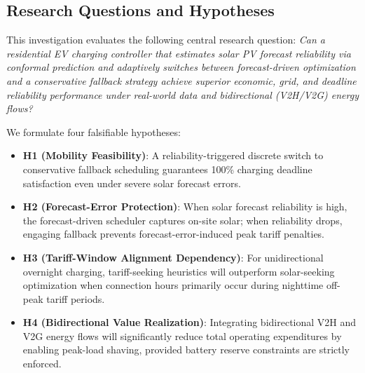 \documentclass[conference]{IEEEtran}
\begin{document}
\subsection{Research Questions and Hypotheses}
This investigation evaluates the following central research question:
\textit{Can a residential EV charging controller that estimates solar PV forecast reliability via conformal prediction and adaptively switches between forecast-driven optimization and a conservative fallback strategy achieve superior economic, grid, and deadline reliability performance under real-world data and bidirectional (V2H/V2G) energy flows?}

We formulate four falsifiable hypotheses:
\begin{itemize}
    \item \textbf{H1 (Mobility Feasibility)}: A reliability-triggered discrete switch to conservative fallback scheduling guarantees 100\% charging deadline satisfaction even under severe solar forecast errors.
    \item \textbf{H2 (Forecast-Error Protection)}: When solar forecast reliability is high, the forecast-driven scheduler captures on-site solar; when reliability drops, engaging fallback prevents forecast-error-induced peak tariff penalties.
    \item \textbf{H3 (Tariff-Window Alignment Dependency)}: For unidirectional overnight charging, tariff-seeking heuristics will outperform solar-seeking optimization when connection hours primarily occur during nighttime off-peak tariff periods.
    \item \textbf{H4 (Bidirectional Value Realization)}: Integrating bidirectional V2H and V2G energy flows will significantly reduce total operating expenditures by enabling peak-load shaving, provided battery reserve constraints are strictly enforced.
\end{itemize}
\end{document}
